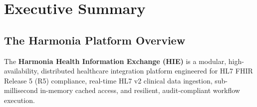 
\chapter*{Executive Summary}

\section*{The Harmonia Platform Overview}

The \textbf{Harmonia Health Information Exchange (HIE)} is a modular, high-availability, distributed healthcare integration platform engineered for HL7 FHIR Release 5 (R5) compliance, real-time HL7 v2 clinical data ingestion, sub-millisecond in-memory cached access, and resilient, audit-compliant workflow execution.

